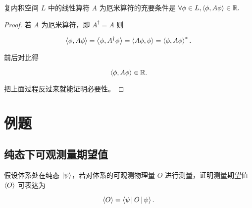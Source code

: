 \begin{theorem}
复内积空间 $L $ 中的线性算符 $A $ 为厄米算符的充要条件是 $\forall \phi\in L, \Braket{\phi , A \phi}\in \mathbb{R} .$
\end{theorem}

\begin{proof}

若 $A $ 为厄米算符，即 $A^\dag=A $ 则

\begin{equation}
\Braket{\phi , A \phi}
=\Braket{\phi , A^\dag \phi}
=\Braket{A \phi , \phi}
=\Braket{\phi , A \phi}^*.
\end{equation}

前后对比得

\begin{equation}
\Braket{\phi , A \phi}\in \mathbb{R}.
\end{equation}

把上面过程反过来就能证明必要性。

\end{proof}

\section{例题}

\subsection{纯态下可观测量期望值}

\begin{example}

假设体系处在纯态 $\Ket{\psi } $，若对体系的可观测物理量 $O $ 进行测量，证明测量期望值 $\Braket{O} $ 可表达为

\begin{equation}
\Braket{O}
=\Braket{\psi | O | \psi}.
\end{equation}

\end{example}

